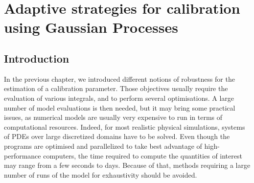 \documentclass[../../Main_ManuscritThese.tex]{subfiles}
\begin{document}
\chapter{Adaptive strategies for calibration using Gaussian Processes}
\label{chap:adaptative_design_gp}
\minitoc
\newpage
\subfileLocal{\pagestyle{contentStyle}}



\section{Introduction}

In the previous chapter, we introduced different notions of robustness
for the estimation of a calibration parameter. Those objectives
usually require the evaluation of various integrals, and to perform
several optimisations. A large number of model evaluations is then
needed, but it may bring some practical issues, as numerical models
are usually very expensive to run in terms of computational
resources. Indeed, for most realistic physical simulations, systems of
PDEs over large discretized domains have to be solved. Even though the
programs are optimised and parallelized to take best advantage of
high-performance computers, the time required to compute the
quantities of interest may range from a few seconds to days. Because
of that, methods requiring a large number of runs of the model for
exhaustivity should be avoided.


\end{document}
